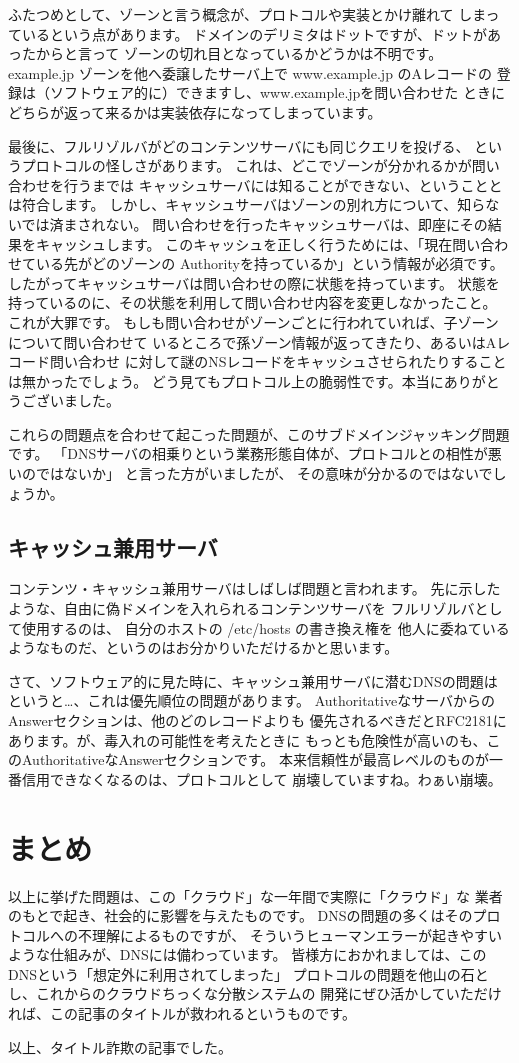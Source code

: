 ふたつめとして、ゾーンと言う概念が、プロトコルや実装とかけ離れて
しまっているという点があります。
ドメインのデリミタはドットですが、ドットがあったからと言って
ゾーンの切れ目となっているかどうかは不明です。
example.jp ゾーンを他へ委譲したサーバ上で www.example.jp のAレコードの
登録は（ソフトウェア的に）できますし、www.example.jpを問い合わせた
ときにどちらが返って来るかは実装依存になってしまっています。

最後に、フルリゾルバがどのコンテンツサーバにも同じクエリを投げる、
というプロトコルの怪しさがあります。
これは、どこでゾーンが分かれるかが問い合わせを行うまでは
キャッシュサーバには知ることができない、ということとは符合します。
しかし、キャッシュサーバはゾーンの別れ方について、知らないでは済まされない。
問い合わせを行ったキャッシュサーバは、即座にその結果をキャッシュします。
このキャッシュを正しく行うためには、「現在問い合わせている先がどのゾーンの
Authorityを持っているか」という情報が必須です。
したがってキャッシュサーバは問い合わせの際に状態を持っています。
状態を持っているのに、その状態を利用して問い合わせ内容を変更しなかったこと。
これが大罪です。
もしも問い合わせがゾーンごとに行われていれば、子ゾーンについて問い合わせて
いるところで孫ゾーン情報が返ってきたり、あるいはAレコード問い合わせ
に対して謎のNSレコードをキャッシュさせられたりすることは無かったでしょう。
どう見てもプロトコル上の脆弱性です。本当にありがとうございました。

これらの問題点を合わせて起こった問題が、このサブドメインジャッキング問題です。
「DNSサーバの相乗りという業務形態自体が、プロトコルとの相性が悪いのではないか」
と言った方がいましたが、 その意味が分かるのではないでしょうか。


\subsection{ キャッシュ兼用サーバ }
コンテンツ・キャッシュ兼用サーバはしばしば問題と言われます。
先に示したような、自由に偽ドメインを入れられるコンテンツサーバを
フルリゾルバとして使用するのは、 自分のホストの /etc/hosts の書き換え権を
他人に委ねているようなものだ、というのはお分かりいただけるかと思います。

さて、ソフトウェア的に見た時に、キャッシュ兼用サーバに潜むDNSの問題は
というと…、これは優先順位の問題があります。
AuthoritativeなサーバからのAnswerセクションは、他のどのレコードよりも
優先されるべきだとRFC2181にあります。が、毒入れの可能性を考えたときに
もっとも危険性が高いのも、このAuthoritativeなAnswerセクションです。
本来信頼性が最高レベルのものが一番信用できなくなるのは、プロトコルとして
崩壊していますね。わぁい崩壊。


\section{まとめ}
以上に挙げた問題は、この「クラウド」な一年間で実際に「クラウド」な
業者のもとで起き、社会的に影響を与えたものです。
DNSの問題の多くはそのプロトコルへの不理解によるものですが、
そういうヒューマンエラーが起きやすいような仕組みが、DNSには備わっています。
皆様方におかれましては、このDNSという「想定外に利用されてしまった」
プロトコルの問題を他山の石とし、これからのクラウドちっくな分散システムの
開発にぜひ活かしていただければ、この記事のタイトルが救われるというものです。

以上、タイトル詐欺の記事でした。

